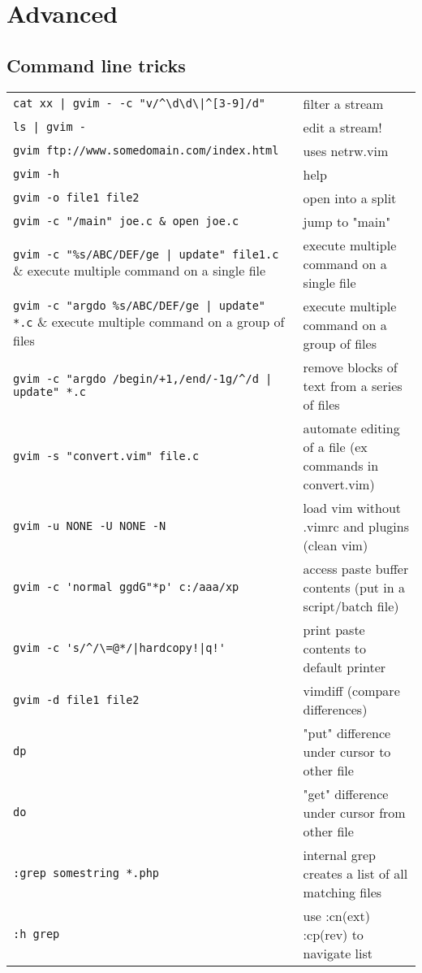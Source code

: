 \section{Advanced}

\subsection{Command line tricks}
\begin{center}
\begin{longtable}{l|l}
\verb!cat xx | gvim - -c "v/^\d\d\|^[3-9]/d"! & filter a stream\\
\verb!ls | gvim -! & edit a stream!\\
\verb!gvim ftp://www.somedomain.com/index.html! & uses netrw.vim\\
\verb!gvim -h! & help\\
\verb!gvim -o file1 file2! & open into a split\\
\verb!gvim -c "/main" joe.c & open joe.c !& jump to "main"\\
\verb!gvim -c "%s/ABC/DEF/ge | update" file1.c! & execute multiple command on a single file\\
\verb!gvim -c "argdo %s/ABC/DEF/ge | update" *.c! & execute multiple command on a group of files\\
\verb!gvim -c "argdo /begin/+1,/end/-1g/^/d | update" *.c! & remove blocks of text from a series of files\\
\verb!gvim -s "convert.vim" file.c! & automate editing of a file (ex commands in convert.vim)\\
\verb!gvim -u NONE -U NONE -N! & load vim without .vimrc and plugins (clean vim)\\
\verb!gvim -c 'normal ggdG"*p' c:/aaa/xp! & access paste buffer contents (put in a script/batch file)\\
\verb?gvim -c 's/^/\=@*/|hardcopy!|q!'? & print paste contents to default printer\\
\verb!gvim -d file1 file2! & vimdiff (compare differences)\\
\verb!dp! & "put" difference under cursor to other file\\
\verb!do! & "get" difference under cursor from other file\\
\verb!:grep somestring *.php! & internal grep creates a list of all matching files\\
\verb!:h grep! & use :cn(ext) :cp(rev) to navigate list
\end{longtable}
\end{center}

